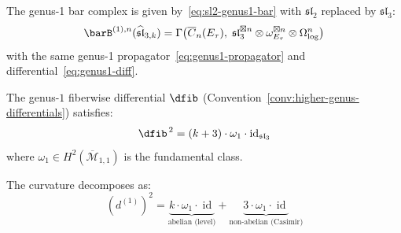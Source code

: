 The genus-1 bar complex is given by~\eqref{eq:sl2-genus1-bar} with $\mathfrak{sl}_2$ replaced by $\mathfrak{sl}_3$:
\begin{equation}\label{eq:sl3-genus1-bar}
\barB^{(1),n}(\widehat{\mathfrak{sl}}_{3,k}) = \Gamma\bigl(\overline{C}_n(E_\tau),\; \mathfrak{sl}_3^{\boxtimes n} \otimes \omega_{E_\tau}^{\boxtimes n} \otimes \Omega^n_{\log}\bigr)
\end{equation}
with the same genus-1 propagator~\eqref{eq:genus1-propagator} and differential~\eqref{eq:genus1-diff}.

\begin{theorem}
\label{thm:sl3-genus1-curvature}
The genus-$1$ fiberwise differential
$\dfib$ \textup{(}Convention~\textup{\ref{conv:higher-genus-differentials})} satisfies:
\begin{equation}\label{eq:sl3-genus1-dsquared}
\dfib^{\,2} = (k+3) \cdot \omega_1 \cdot \operatorname{id}_{\mathfrak{sl}_3}
\end{equation}
where $\omega_1 \in H^2(\overline{\mathcal{M}}_{1,1})$ is the fundamental class.

The curvature decomposes as:
\begin{equation}\label{eq:sl3-curvature-decomposition}
(d^{(1)})^2 = \underbrace{k \cdot \omega_1 \cdot \operatorname{id}}_{\text{abelian (level)}} + \underbrace{3 \cdot \omega_1 \cdot \operatorname{id}}_{\text{non-abelian (Casimir)}}
\end{equation}
\end{theorem}

